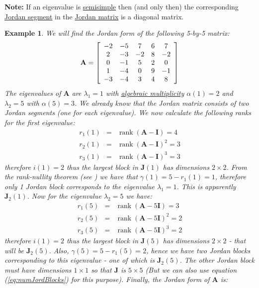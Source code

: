 \documentclass[a4paper,10pt,oneside]{book}
\newtheorem{example}{Example}
\begin{document}
\noindent \textbf{Note:} If an eigenvalue is \hyperlink{def:semisimpleEigenvalue}{semisimple} then (and only then) the corresponding \hyperlink{def:JordanSegment}{Jordan segment} in the \hyperlink{def:JordanMatrix}{Jordan matrix} is a diagonal matrix. 
\begin{example}
 We will find the Jordan form of the following 5-by-5 matrix:
 \begin{equation}
  \mathbf{A}=\left[ {\begin{array}{*{5}c}
          -2  & -5  &  7  &  6  &  7  \\
           2  & -3  & -2  &  8  & -2  \\
           0  & -1  &  5  &  2  &  0  \\
           1  & -4  &  0  &  9  & -1  \\
          -3  & -4  &  3  &  4  &  8 
         \end{array}}\right]
 \end{equation}
 The eigenvalues of $\mathbf{A}$ are $\lambda_1=1$ with \hyperlink{def:algebraicMultiplicity}{algebraic multiplicity} $\alpha(1)=2$ and $\lambda_2=5$ with $\alpha(5)=3$. We already know that the Jordan matrix consists of two Jordan segments (one for each eigenvalue). We now calculate the following ranks for the first eigenvalue:
 \begin{eqnarray}
  r_1(1)&=&\operatorname{rank}(\mathbf{A}-\mathbf{I})=4\\
  r_2(1)&=&\operatorname{rank}(\mathbf{A}-\mathbf{I})^2=3\\
  r_3(1)&=&\operatorname{rank}(\mathbf{A}-\mathbf{I})^3=3
 \end{eqnarray}
 therefore $i(1)=2$ thus the largest block in $\mathbf{J}(1)$ has dimensions $2\times 2$. From the rank-nullity theorem (see \cite[pp. 57-58]{Rom00}) we have that $\gamma(1)=5-r_1(1)=1$, therefore only 1 Jordan block corresponds to the eigenvalue $\lambda_1=1$. This is apparently $\mathbf{J}_2(1)$. Now for the eigenvalue $\lambda_2=5$ we have:
\begin{eqnarray}
  r_1(5)&=&\operatorname{rank}(\mathbf{A}-5\mathbf{I})=3\\
  r_2(5)&=&\operatorname{rank}(\mathbf{A}-5\mathbf{I})^2=2\\
  r_3(5)&=&\operatorname{rank}(\mathbf{A}-5\mathbf{I})^3=2
 \end{eqnarray}
therefore $i(1)=2$ thus the largest block in $\mathbf{J}(5)$ has dimensions $2\times 2$ - that will be $\mathbf{J}_2(5)$. Also, $\gamma(5)=5-r_1(5)=2$, hence we have two Jordan blocks corresponding to this eigenvalue - one of which is $\mathbf{J}_2(5)$. The other Jordan block must have dimensions $1\times 1$ so that $\mathbf{J}$ is $5\times 5$ (But we can also use equation (\ref{eq:numJordBlocks}) for this purpose). Finally, the Jordan form of $\mathbf{A}$ is:

\end{example}
\end{document}
